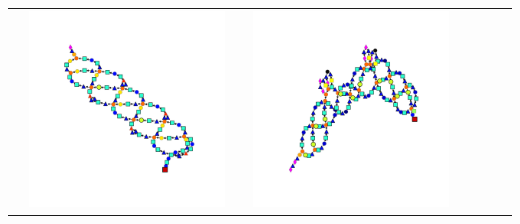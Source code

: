 \begin{table}[t!]
\begin{tabular}{p{1.7cm}ccp{0.2cm}ccccc}
		& \multicolumn{2}{c}{{\includegraphics[width=\width,align=c,trim={3cm 3cm 3cm 3cm},clip]{dag_train_5.pdf}}} & & {\includegraphics[width=\width,align=c,trim={2.3cm 3cm 2.3cm 3cm},clip]{dag_test_0.pdf}} & 

\end{tabular}
\end{table}
